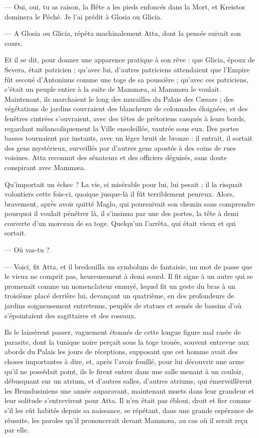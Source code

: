 \documentclass[a4paper, 11pt, oneside, polutonikogreek, french]{article}
\begin{document}
--- Oui, oui, tu as raison, la Bête a les pieds enfoncés dans la Mort, et Kreistos dominera le Péché. Je l'ai prédit à Glosia ou Glicia.

--- A Glosia ou Glicia, répéta machinalement Atta, dont la pensée suivait son cours.

Et il se dit, pour donner une apparence pratique à son rêve : que Glicia, époux de Severa, était patricien ; qu'avec lui, d'autres patriciens attendaient que l'Empire fût secoué d'Antoninus comme une toge de sa poussière ; qu'avec ces patriciens, c'était un peuple entier à la suite de Mammæa, si Mammæa le voulait. Maintenant, ils marchaient le long des murailles du Palais des Cæsars ; des végétations de jardins couvraient des blancheurs de colonnades éloignées, et des fenêtres cintrées s'ouvraient, avec des têtes de prétoriens casqués à leurs bords, regardant mélancoliquement la Ville ensoleillée, vautrée sous eux. Des portes basses tournaient par instants, avec un léger bruit de bronze : il entrait, il sortait des gens mystérieux, surveillés par d'autres gens apostés à des coins de rues voisines. Atta reconnut des sénateurs et des officiers déguisés, sans doute conspirant avec Mammæa.

Qu'importait un échec ? La vie, si misérable pour lui, lui pesait ; il la risquait volontiers cette fois-ci, quoique jusque-là il fût terriblement peureux. Alors, bravement, après avoir quitté Maglo, qui poursuivait son chemin sans comprendre pourquoi il voulait pénétrer là, il s'insinua par une des portes, la tête à demi couverte d'un morceau de sa toge. Quelqu'un l'arrêta, qui était vieux et qui sortait.

--- Où vas-tu ?

--- Voici, fit Atta, et il bredouilla un symbolum de fantaisie, un mot de passe que le vieux ne comprit pas, heureusement à demi sourd. Il fit signe à un autre qui se promenait comme un nomenclateur ennuyé, lequel fit un geste du bras à un troisième placé derrière lui, devançant un quatrième, en des profondeurs de jardins soigneusement entretenus, peuplés de statues et semés de bassins d'où s'épointaient des sagittaires et des roseaux.

Ils le laissèrent passer, vaguement étonnés de cette longue figure mal rasée de parasite, dont la tunique noire perçait sous la toge trouée, souvent entrevue aux abords du Palais les jours de réceptions, supposant que cet homme avait des choses importantes à dire, et, après l'avoir fouillé, pour lui découvrir une arme qu'il ne possédait point, ils le firent entrer dans une salle menant à un couloir, débusquant sur un atrium, et d'autres salles, d'autres atriums, qui émerveillèrent les Brundusiniens une année auparavant, maintenant muets dans leur grandeur et leur solitude s'entrevirent pour Atta. Il n'en était pas ébloui, droit et fier comme s'il les eût habités depuis sa naissance, se répétant, dans une grande espérance de réussite, les paroles qu'il prononcerait devant Mammæa, au cas où il serait reçu par elle.
\end{document}
